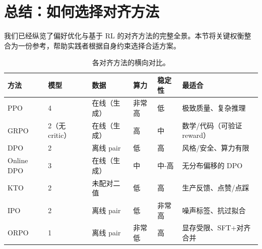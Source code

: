\section{总结：如何选择对齐方法}
\label{sec:method-comparison}

我们已经纵览了偏好优化与基于 RL 的对齐方法的完整全景。本节将关键权衡整合为一份参考，帮助实践者根据自身约束选择合适方案。

\begin{table}[ht!]
\centering
\caption{各对齐方法的横向对比。}
{\footnotesize
\noindent\begin{tabularx}{\linewidth}{@{}l l l l l Z{1}@{}}
\toprule
\textbf{方法} & \textbf{模型} & \textbf{数据} & \textbf{算力} & \textbf{稳定性} & \textbf{最适合} \\
\midrule
PPO & 4 & 在线（生成） & 非常高 & 低 & 极致质量、复杂推理 \\
GRPO & 2（无 critic） & 在线（生成） & 高 & 中 & 数学/代码（可验证 reward） \\
DPO & 2 & 离线 pair & 低 & 高 & 风格/安全、算力有限 \\
Online DPO & 3 & 在线（生成） & 中 & 中-高 & 无分布偏移的 DPO \\
KTO & 2 & 未配对二值 & 低 & 高 & 生产反馈、点赞/点踩 \\
IPO & 2 & 离线 pair & 低 & 非常高 & 噪声标签、抗过拟合 \\
ORPO & 1 & 离线 pair & 非常低 & 高 & 显存受限、SFT+对齐合并 \\

\end{tabularx}}
\end{table}
